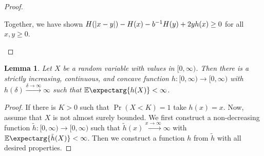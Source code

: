 \documentclass{scrartcl}
\newcommand{\Prof}[1]{\Pr(#1)}
\newcommand{\Ex}{\E\expectarg}
\theoremstyle{plain}\newtheorem{theorem}{Theorem}[section]
\newtheorem{lemma}[theorem]{Lemma}
\theoremstyle{definition}
\theoremstyle{remark}
\begin{document}
\begin{appendix}
\begin{proof}
\begin{enumerate}[label=(\roman*)]
	Together, we have shown $H(\left| x-y \right|) - H(x) - b^{-1} H(y) + 2 y h(x) \geq 0$ for all $x,y\geq0$.
\end{enumerate}
\end{proof}
\begin{lemma}\label{lmm:nondec:existence}
	Let $X$ be a random variable with values in $[0,\infty)$. Then there is a strictly increasing, continuous, and concave function $h \colon [0,\infty) \to [0,\infty)$ with $h(\delta)\xrightarrow{\delta\to\infty}\infty$ such that $\Ex{h(X)} < \infty$.
\end{lemma}
\begin{proof}
	If there is $K > 0$ such that $\Prof{X < K} = 1$ take $h(x) = x$. Now, assume that $X$ is not almost surely bounded.
	We first construct a non-decreasing function $\tilde h \colon [0,\infty) \to [0,\infty)$ such that $\tilde h (x) \xrightarrow{x\to\infty}\infty$ with $\Ex{\tilde h(X)} < \infty$.
	Then we construct a function $h$ from $\tilde h$ with all desired properties.
	

\end{proof}
\end{appendix}
\end{document}
